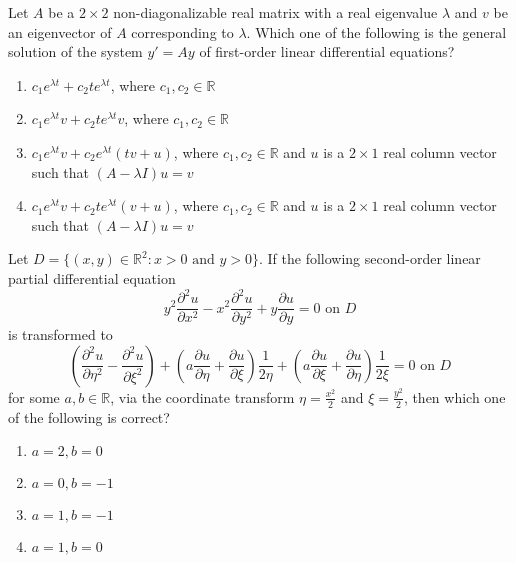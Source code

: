 \item Let $A$ be a $2 \times 2$ non-diagonalizable real matrix with a real eigenvalue $\lambda$ and $v$ be an eigenvector of $A$ corresponding to $\lambda$. Which one of the following is the general solution of the system $y' = Ay$ of first-order linear differential equations?
\begin{enumerate}
    \item $c_1 e^{\lambda t} + c_2 te^{\lambda t}$, where $c_1, c_2 \in \mathbb{R}$
    \item $c_1 e^{\lambda t} v + c_2 t e^{\lambda t} v$, where $c_1, c_2 \in \mathbb{R}$
    \item $c_1 e^{\lambda t} v + c_2 e^{\lambda t} (tv + u)$, where $c_1, c_2 \in \mathbb{R}$ and $u$ is a $2 \times 1$ real column vector such that $(A - \lambda I)u = v$
    \item $c_1 e^{\lambda t} v + c_2 te^{\lambda t} (v + u)$, where $c_1, c_2 \in \mathbb{R}$ and $u$ is a $2 \times 1$ real column vector such that $(A - \lambda I)u = v$
\end{enumerate}
\item Let $D = \{(x, y) \in \mathbb{R}^2 : x > 0 \text{ and } y > 0\}$. If the following second-order linear partial differential equation
\[
y^2 \frac{\partial^2 u}{\partial x^2} - x^2 \frac{\partial^2 u}{\partial y^2} + y \frac{\partial u}{\partial y} = 0 \text{ on } D
\]
is transformed to
\[
\left( \frac{\partial^2 u}{\partial \eta^2} - \frac{\partial^2 u}{\partial \xi^2} \right) + \left( a \frac{\partial u}{\partial \eta} + \frac{\partial u}{\partial \xi} \right) \frac{1}{2 \eta} + \left( a \frac{\partial u}{\partial \xi} + \frac{\partial u}{\partial \eta} \right) \frac{1}{2 \xi} = 0 \text{ on } D
\]
for some $a, b \in \mathbb{R}$, via the coordinate transform $\eta = \frac{x^2}{2}$ and $\xi = \frac{y^2}{2}$, then which one of the following is correct?
\begin{enumerate}
    \item $a = 2, b = 0$
    \item $a = 0, b = -1$
    \item $a = 1, b = -1$
    \item $a = 1, b = 0$
\end{enumerate}

\bigskip

